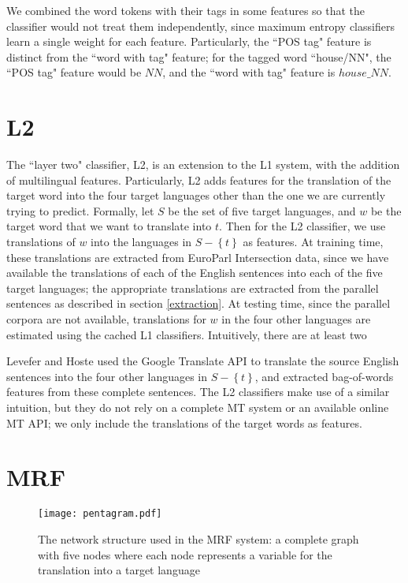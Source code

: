 \documentclass[11pt,letterpaper]{article}
\begin{document}
We combined the word tokens with their tags in some features so that the
classifier would not treat them independently, since maximum entropy
classifiers learn a single weight for each feature.
Particularly, the ``POS tag" feature is distinct from the ``word with tag"
feature; for the tagged word ``house/NN", the ``POS tag" feature would be $NN$,
and the ``word with tag" feature is $house\_NN$. 

\section{L2}
The ``layer two" classifier, L2, is an extension to the L1 system, with the
addition of multilingual features. Particularly, L2 adds features for the
translation of the target word into the four target languages other than the
one we are currently trying to predict. Formally, let $S$ be the set of five
target languages, and $w$ be the target word that we want to translate into
$t$. Then for the L2 classifier, we use translations of $w$ into the languages
in $S - \left\lbrace t \right\rbrace$ as features. At training time, these
translations are extracted from EuroParl Intersection data, since we have
available the translations of each of the English sentences into each of the
five target languages; the appropriate translations are extracted from the
parallel sentences as described in section \ref{extraction}. At testing time,
since the parallel corpora are not available, translations for $w$ in the four
other languages are estimated using the cached L1 classifiers. Intuitively,
there are at least two 

Levefer and Hoste  used the
Google Translate API to translate the source English sentences into the four
other languages in $S - \left\lbrace t \right\rbrace$, and extracted
bag-of-words features from these complete sentences. The L2 classifiers make
use of a similar intuition, but they do not rely on a complete MT system or an
available online MT API; we only include the translations of the target words
as features.

\section{MRF}
\begin{figure}
  \begin{center}
  \texttt{[image: pentagram.pdf]}
  \end{center}
  \caption{The network structure used in the MRF system: a complete graph with
    five nodes where each node represents a variable for the translation into a
    target language}
  \label{fig:pentagram}
\end{figure}
\end{document}
